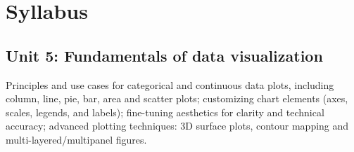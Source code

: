 \section*{Syllabus}

    \subsection*{Unit 5: Fundamentals of data visualization}
        Principles and use cases for categorical and continuous data plots, including column, line, pie, bar, area and scatter plots; customizing chart elements (axes, scales, legends, and labels); fine-tuning aesthetics for clarity and technical accuracy; advanced plotting techniques: 3D surface plots, contour mapping and multi-layered/multipanel figures.